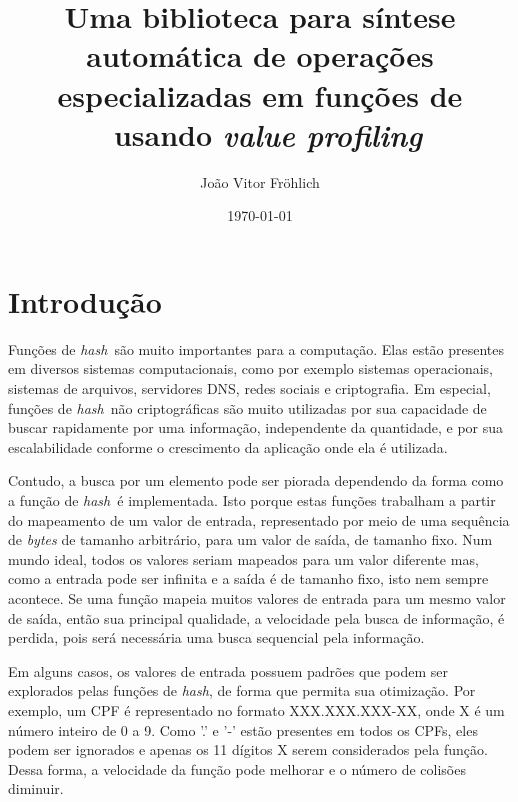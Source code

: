 \documentclass[12pt]{article}
\title{Uma biblioteca para síntese automática de operações especializadas em funções de \hash\ usando \textit{value profiling}}
\author{João Vitor Fr\"ohlich}
\date{\today}
\newcommand{\hash}{\textit{hash}}
\begin{document}
\maketitle

\section{Introdução}



Funções de \hash\ são muito importantes para a computação. Elas estão presentes em diversos sistemas computacionais, como por exemplo sistemas operacionais, sistemas de arquivos, servidores DNS, redes sociais e criptografia. Em especial, funções de \hash\ não criptográficas são muito utilizadas por sua capacidade de buscar rapidamente por uma informação, independente da quantidade, e por sua escalabilidade conforme o crescimento da aplicação onde ela é utilizada.

Contudo, a busca por um elemento pode ser piorada dependendo da forma como a função de \hash\ é implementada. Isto porque estas funções trabalham a partir do mapeamento de um valor de entrada, representado por meio de uma sequência de \textit{bytes} de tamanho arbitrário, para um valor de saída, de tamanho fixo. Num mundo ideal, todos os valores seriam mapeados para um valor diferente mas, como a entrada pode ser infinita e a saída é de tamanho fixo, isto nem sempre acontece. Se uma função mapeia muitos valores de entrada para um mesmo valor de saída, então sua principal qualidade, a velocidade pela busca de informação, é perdida, pois será necessária uma busca sequencial pela informação.

Em alguns casos, os valores de entrada possuem padrões que podem ser explorados pelas funções de \hash, de forma que permita sua otimização. Por exemplo, um CPF é representado no formato XXX.XXX.XXX-XX, onde X é um número inteiro de 0 a 9. Como '.' e '-' estão presentes em todos os CPFs, eles podem ser ignorados e apenas os 11 dígitos X serem considerados pela função. Dessa forma, a velocidade da função pode melhorar e o número de colisões diminuir.
\end{document}
